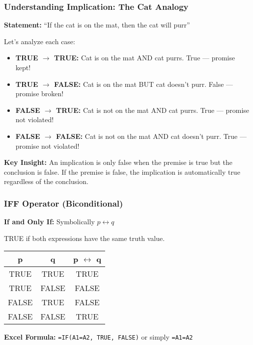 \documentclass{beamer}
\begin{document}
\begin{frame}
\frametitle{Understanding Implication: The Cat Analogy}
\textbf{Statement:} ``If the cat is on the mat, then the cat will purr''\pause

\vspace{0.3cm}
Let's analyze each case:

\begin{itemize}
    \item \textbf{TRUE $\rightarrow$ TRUE:} Cat is on the mat AND cat purrs. \alert{True --- promise kept!}\pause
    
    \item \textbf{TRUE $\rightarrow$ FALSE:} Cat is on the mat BUT cat doesn't purr. \alert{False --- promise broken!}\pause
    
    \item \textbf{FALSE $\rightarrow$ TRUE:} Cat is not on the mat AND cat purrs. \alert{True --- promise not violated!}\pause
    
    \item \textbf{FALSE $\rightarrow$ FALSE:} Cat is not on the mat AND cat doesn't purr. \alert{True --- promise not violated!}
\end{itemize}\pause

\vspace{0.3cm}
\textbf{Key Insight:} An implication is only false when the premise is true but the conclusion is false. If the premise is false, the implication is automatically true regardless of the conclusion.
\end{frame}

\begin{frame}
\frametitle{IFF Operator (Biconditional)}
\textbf{If and Only If:} Symbolically $p \leftrightarrow q$\pause

TRUE if both expressions have the \alert{same} truth value.\pause

\vspace{0.3cm}
\begin{center}
\begin{tabular}{|c|c|c|}
\hline
\textbf{p} & \textbf{q} & \textbf{p $\leftrightarrow$ q} \\
\hline
TRUE & TRUE & TRUE \\
\hline
TRUE & FALSE & FALSE \\
\hline
FALSE & TRUE & FALSE \\
\hline
FALSE & FALSE & TRUE \\
\hline
\end{tabular}
\end{center}\pause

\vspace{0.3cm}
\textbf{Excel Formula:} \texttt{=IF(A1=A2, TRUE, FALSE)} or simply \texttt{=A1=A2}
\end{frame}
\end{document}
